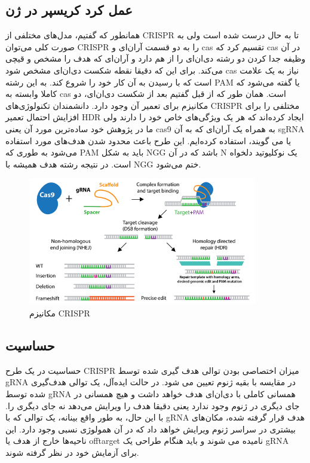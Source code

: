 \documentclass[12pt,a4paper,BCOR=.7cm,headsepline,bibliography=totoc]{report}
\begin{document}
\subsection{عمل کرد کریسپر در ژن}
همانطور که گفتیم، مدل‌های مختلفی از CRISPR تا به حال درست شده است ولی به صورت کلی می‌توان CRISPR را به دو قسمت آر‌ان‌ای و  cas تقسیم کرد که cas در آن وظیفه جدا کردن دو رشته دی‌ان‌ای را از هم دارد و آر‌ان‌ای که هدف را مشخص و قیچی می‌کند. برای این که دقیقا نقطه شکست دی‌ان‌ای مشخص شود cas نیاز به یک علامت است که با رسیدن به آن کار خود را شروع کند. به این رشته PAM یا 
گفته می‌شود که کاملا وابسته به cas است. همان طور که از قبل گفتیم بعد از شکست دی‌ان‌ای، دو مکانیزم برای تعمیر آن وجود دارد. دانشمندان تکنولوژی‌های CRISPR مختلفی را برای افزایش احتمال تعمیر HDR ایجاد کرده‌اند که هر یک ویژگی‌های خاص خود را دارند ولی ما در پژوهش خود ساده‌ترین مورد آن یعنی cas9 به همراه یک آر‌ان‌ای که به آن sgRNA یا 
می گویند، استفاده کرده‌ایم. این طرح باعث محدود شدن هدف‌های مورد استفاده می‌شود به طوری که ‌PAM باید به شکل NGG باشد که در آن N یک نوکلیوتید دلخواه است. در نتیجه رشته هدف همیشه با NGG ختم می‌شود. 
\begin{figure}[!h]
\centering
\includegraphics[width=10cm, ]{pictures/cut.png}
\caption{
مکانیزم CRISPR \cite{addgene}
}\label{fig:2}
\end{figure}
 
\subsection{حساسیت}
حساسیت در یک طرح CRISPR میزان اختصاصی بودن توالی هدف گیری شده توسط gRNA در مقایسه با بقیه ژنوم تعیین می شود. در حالت ایده‌آل، یک توالی هدف‌گیری شده توسط gRNA همسانی کاملی با دی‌ان‌ای هدف خواهد داشت و هیچ همسانی در جای دیگری در ژنوم وجود ندارد یعنی دقیقا هدف را ویرایش می‌دهد نه جای دیگری را. با این حال، به طور واقع بینانه، یک توالی که با gRNA هدف قرار گرفته شده، مکان‌های بیشتری در سراسر ژنوم ویرایش خواهد داد که در آن همولوژی نسبی وجود دارد. این ناحیه‌ها خارج از هدف یا offtarget نامیده می شوند و باید هنگام طراحی یک gRNA برای آزمایش خود در نظر گرفته شوند.
\end{document}
